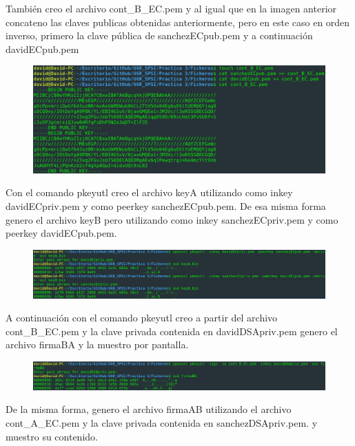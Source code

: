\documentclass[10pt,a4paper,spanish]{report}
\begin{document}
\noindent
También creo el archivo cont\_B\_EC.pem y al igual que en la imagen anterior concateno las claves publicas obtenidas anteriormente, pero en este caso en orden inverso, primero la clave pública de sanchezECpub.pem y a continuación davidECpub.pem

\begin{figure}[!hbp]
 \centering  \includegraphics[width=1\textwidth]{./Imagenes/8_7.png}
\end{figure}

\noindent
Con el comando pkeyutl creo el archivo keyA utilizando como inkey davidECpriv.pem y como peerkey sanchezECpub.pem. De esa misma forma genero el archivo keyB pero utilizando como inkey sanchezECpriv.pem y como peerkey davidECpub.pem.

\begin{figure}[!hbp]
 \centering  \includegraphics[width=1\textwidth]{./Imagenes/8_8.png}
\end{figure}

\newpage
\noindent
A continuación con el comando pkeyutl creo a partir del archivo cont\_B\_EC.pem y la clave privada contenida en davidDSApriv.pem genero el archivo firmaBA y la muestro por pantalla.

\begin{figure}[!hbp]
 \centering  \includegraphics[width=1\textwidth]{./Imagenes/8_9.png}
\end{figure}

\noindent
De la misma forma, genero el archivo firmaAB utilizando el archivo cont\_A\_EC.pem y la clave privada contenida en sanchezDSApriv.pem. y muestro su contenido.
\end{document}
